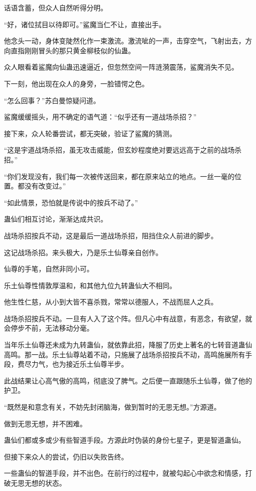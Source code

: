\begin{this_body}
话语含蓄，但众人自然听得分明。

“好，诸位拭目以待即可。”鲨魔当仁不让，直接出手。

他念头一动，身体变陡然化作一束激流。激流呲的一声，击穿空气，飞射出去，方向直指刚刚冒头的那只黄金柳枝似的仙蛊。

众人眼看着鲨魔向仙蛊迅速逼近，但忽然空间一阵涟漪震荡，鲨魔消失不见。

下一刻，他出现在众人的身旁，一脸错愕之色。

“怎么回事？”苏白曼惊疑问道。

鲨魔缓缓摇头，用不确定的语气道：“似乎还有一道战场杀招？”

接下来，众人轮番尝试，都无突破，验证了鲨魔的猜测。

“这是宇道战场杀招，虽无攻击威能，但玄妙程度绝对要远远高于之前的战场杀招。”

“你们发现没有，我们每一次被传送回来，都在原来站立的地点。一丝一毫的位置。都没有改变过。”

“如此情景，恐怕就是传说中的按兵不动了。”

蛊仙们相互讨论，渐渐达成共识。

战场杀招按兵不动，这是最后一道战场杀招，阻挡住众人前进的脚步。

这记战场杀招。来头极大，乃是乐土仙尊亲自创作。

仙尊的手笔，自然非同小可。

乐土仙尊性情敦厚温和，和其他九位九转蛊仙大不相同。

他生性仁慈，从小到大皆不喜杀戮，常常以德服人，不战而屈人之兵。

战场杀招按兵不动。一旦有人入了这个阵。但凡心中有战意，有恶念，有欲望，就会停步不前，无法移动分毫。

当年乐土仙尊还未成为九转蛊仙，就依靠此招，降服了历史上著名的七转音道蛊仙高鸣。那一战。乐土仙尊站着不动，只施展了战场杀招按兵不动，高鸣施展所有手段，费尽力气，也为接近乐土仙尊半步。

此战结果让心高气傲的高鸣，彻底没了脾气。之后便一直跟随乐土仙尊，做了他的护卫。

“既然是和意念有关，不妨先封闭脑海，做到暂时的无思无想。”方源道。

做到无思无想，并不困难。

蛊仙们都或多或少有些智道手段。方源此时伪装的身份七星子，更是智道蛊仙。

但接下来众人的尝试，仍旧以失败告终。

一些蛊仙的智道手段，并不出色。在前行的过程中，就被勾起心中欲念和情感，打破无思无想的状态。


\end{this_body}

